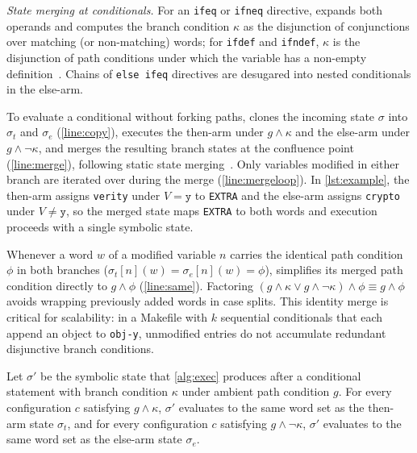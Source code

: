 \documentclass[acmsmall,screen,review,anonymous,nonacm]{acmart}
\begin{document}
  \emph{State merging at conditionals.}
  For an \texttt{ifeq} or \texttt{ifneq} directive, \tool{} expands both operands and computes the branch condition $\kappa$ as the disjunction of conjunctions over matching (or non-matching) words; for \texttt{ifdef} and \texttt{ifndef}, $\kappa$ is the disjunction of path conditions under which the variable has a non-empty definition~\cite{gazzillo2017kmax}.
  Chains of \texttt{else ifeq} directives are desugared into nested conditionals in the else-arm.

  To evaluate a conditional without forking paths, \tool{} clones the incoming state $\sigma$ into $\sigma_t$ and $\sigma_e$ (\autoref{line:copy}), executes the then-arm under $g \land \kappa$ and the else-arm under $g \land \neg\kappa$, and merges the resulting branch states at the confluence point (\autoref{line:merge}), following static state merging~\cite{kuznetsov2012efficient,avgerinos2014enhancing}.
  Only variables modified in either branch are iterated over during the merge (\autoref{line:mergeloop}).
  In \autoref{lst:example}, the then-arm assigns \texttt{verity} under $V = \mathtt{y}$ to \texttt{EXTRA} and the else-arm assigns \texttt{crypto} under $V \ne \mathtt{y}$, so the merged state maps \texttt{EXTRA} to both words and execution proceeds with a single symbolic state.

  Whenever a word $w$ of a modified variable $n$ carries the identical path condition $\phi$ in both branches ($\sigma_t[n](w) = \sigma_e[n](w) = \phi$), \tool{} simplifies its merged path condition directly to $g \land \phi$ (\autoref{line:same}).
  Factoring $(g \land \kappa \lor g \land \neg\kappa) \land \phi \equiv g \land \phi$ avoids wrapping previously added words in case splits.
  This identity merge is critical for scalability: in a Makefile with $k$ sequential conditionals that each append an object to \texttt{obj-y}, unmodified entries do not accumulate redundant disjunctive branch conditions.

  \begin{proposition}\label{prop:merge}
  Let $\sigma'$ be the symbolic state that \autoref{alg:exec} produces after a conditional statement with branch condition $\kappa$ under ambient path condition $g$.
  For every configuration $c$ satisfying $g \land \kappa$, $\sigma'$ evaluates to the same word set as the then-arm state $\sigma_t$, and for every configuration $c$ satisfying $g \land \neg\kappa$, $\sigma'$ evaluates to the same word set as the else-arm state $\sigma_e$.
  \end{proposition}
\end{document}
